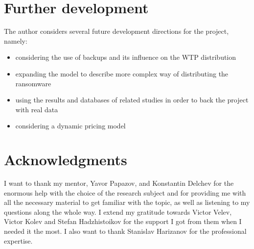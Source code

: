 \documentclass[11pt, a4paper]{article}
\theoremstyle{definition}
\begin{document}
\section{Further development}
	The author considers several future development directions for the project, namely:
	\begin{itemize}
		\item considering the use of backups and its influence on the WTP distribution
		\item expanding the model to describe more complex way of distributing the ransomware
		\item using the results and databases of related studies in order to back the project with real data\cite{paquet2019ransomware}
		\item considering a dynamic pricing model
	\end{itemize}
\section{Acknowledgments}
I want to thank my mentor, Yavor Papazov, and Konstantin Delchev for the enormous help with the choice of the research subject and for providing me with all the necessary material to get familiar with the topic, as well as listening to my questions along the whole way. I extend my gratitude towards Victor Velev, Victor Kolev and Stefan Hadzhistoikov for the support I got from them when I needed it the most. I also want to thank Stanislav Harizanov for the professional expertise.
\nocite{*}


\end{document}
